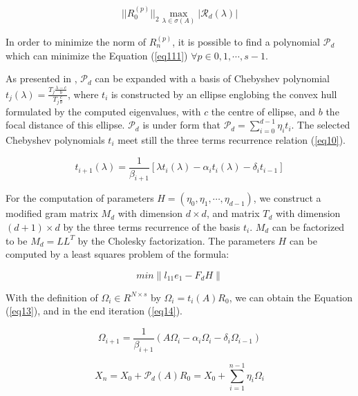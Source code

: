\begin{equation}
\label{eq111}
||R_0^{(p)}||_2 \max_{\lambda \in \sigma(A)}|\mathcal{R}_d(\lambda)|
\end{equation}

In order to minimize the norm of $R_n^{(p)}$, it is possible to find a polynomial $\mathcal{P}_d$ which can minimize the Equation (\ref{eq111}) $\forall p \in 0,1,\cdots,s-1$.

As presented in \cite{wu2018distributed}, $\mathcal{P}_d$ can be expanded with a basis of Chebyshev polynomial $t_j(\lambda)=\frac{T_j \frac{\lambda-c}{b}}{T_j \frac{c}{b}}$, where $t_i$ is constructed by an ellipse englobing the convex hull formulated by the computed eigenvalues, with $c$ the centre of ellipse, and $b$ the focal distance of this ellipse. $\mathcal{P}_d$ is under form that $\mathcal{P}_d=\sum_{i=0}^{d-1}\eta_it_i$. The selected Chebyshev polynomials \(t_i\) meet still the three terms recurrence relation (\ref{eq10}). 

\begin{equation}
\label{eq10}
t_{i+1}(\lambda)=\frac{1}{\beta_{i+1}}[\lambda t_i(\lambda)-\alpha_i t_i(\lambda)-\delta_i t_{i-1}]
\end{equation}


For the computation of parameters $H=(\eta_0,\eta_1,\cdots,\eta_{d-1})$, we construct a modified gram matrix $M_d$ with dimension $d \times d$, and matrix $T_d$ with dimension $(d+1) \times d$ by the three terms recurrence of the basis $t_i$. $M_d$ can be factorized to be $M_d=LL^T$ by the Cholesky factorization. The parameters $H$ can be computed by a least squares problem of the formula:


\begin{equation}
\label{eq112}
min \|l_{11}e_1-F_d H\|
\end{equation}


With the definition of \(\Omega_i \in R^{N \times s}\) by \(\Omega_i=t_i(A)R_0\), we can obtain the Equation (\ref{eq13}), and in the end iteration  (\ref{eq14}).

\begin{equation}
\label{eq13}
\Omega_{i+1}=\frac{1}{\beta_{i+1}}(A\Omega_i-\alpha_i\Omega_i-\delta_i\Omega_{i-1})
\end{equation}

\begin{equation}
\label{eq14}
X_n=X_0+\mathcal{P}_d(A)R_0=X_0+\sum_{i=1}^{n-1}\eta_i\Omega_i
\end{equation}

